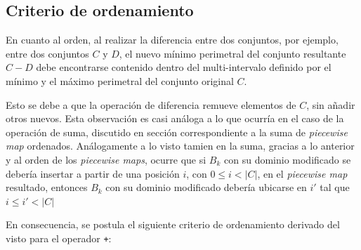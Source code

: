 \subsection{Criterio de ordenamiento}

En cuanto al orden, al realizar la diferencia entre dos conjuntos, por ejemplo, entre dos conjuntos $C$ y $D$, el nuevo mínimo perimetral del conjunto resultante $C - D$ debe encontrarse contenido dentro del multi-intervalo definido por el mínimo y el máximo perimetral del conjunto original $C$. 

Esto se debe a que la operación de diferencia remueve elementos de $C$, sin añadir otros nuevos. Esta observación es casi análoga a lo que ocurría en el caso de la operación de suma, discutido en sección correspondiente a la suma de \textit{piecewise map} ordenados. Análogamente a lo visto tamien en la suma, gracias a lo anterior y al orden de los \textit{piecewise maps}, ocurre que si $B_k$ con su dominio modificado se debería insertar a partir de una posición $i$, con $0 \leq i < |C|$, en el \textit{piecewise map} resultado, entonces $B_k$ con su dominio modificado debería ubicarse en $i'$ tal que $i \leq i' < |C|$

En consecuencia, se postula el siguiente criterio de ordenamiento derivado del visto para el operador \texttt{+}:

\begin{center}
\end{center}


